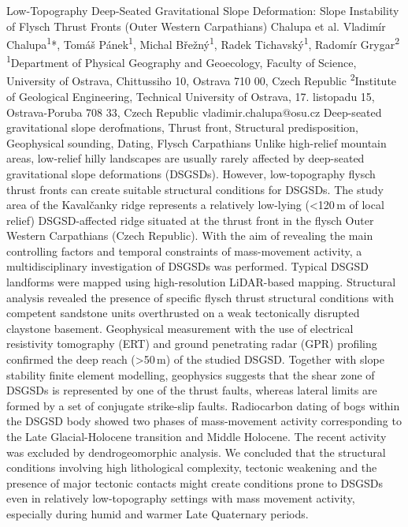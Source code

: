 
\abstract
{Low-Topography Deep-Seated Gravitational Slope Deformation: Slope Instability of Flysch Thrust Fronts (Outer Western Carpathians)} 
{Chalupa et al.} 
{Vladimír Chalupa\textsuperscript{1}*, Tomáš Pánek\textsuperscript{1}, Michal Břežný\textsuperscript{1}, Radek Tichavský\textsuperscript{1}, Radomír Grygar\textsuperscript{2}} 
{\TLtag} 
{
\textsuperscript{1}Department of Physical Geography and Geoecology, Faculty of Science, University of Ostrava, Chittussiho 10, Ostrava 710 00, Czech Republic
\textsuperscript{2}Institute of Geological Engineering, Technical University of Ostrava, 17. listopadu 15, Ostrava-Poruba 708 33, Czech Republic
}
{vladimir.chalupa@osu.cz}  %
{Deep-seated gravitational slope derofmations, Thrust front, Structural predisposition, Geophysical sounding, Dating, Flysch Carpathians}
{Unlike high-relief mountain areas, low-relief hilly landscapes are usually rarely affected by deep-seated gravitational slope deformations (DSGSDs). However, low-topography flysch thrust fronts can create suitable structural conditions for DSGSDs. The study area of the Kavalčanky ridge represents a relatively low-lying (<120 m of local relief) DSGSD-affected ridge situated at the thrust front in the flysch Outer Western Carpathians (Czech Republic). With the aim of revealing the main controlling factors and temporal constraints of mass-movement activity, a multidisciplinary investigation of DSGSDs was performed. Typical DSGSD landforms were mapped using high-resolution LiDAR-based mapping. Structural analysis revealed the presence of specific flysch thrust structural conditions with competent sandstone units overthrusted on a weak tectonically disrupted claystone basement. Geophysical measurement with the use of electrical resistivity tomography (ERT) and ground penetrating radar (GPR) profiling confirmed the deep reach (>50 m) of the studied DSGSD. Together with slope stability finite element modelling, geophysics suggests that the shear zone of DSGSDs is represented by one of the thrust faults, whereas lateral limits are formed by a set of conjugate strike-slip faults. Radiocarbon dating of bogs within the DSGSD body showed two phases of mass-movement activity corresponding to the Late Glacial-Holocene transition and Middle Holocene. The recent activity was excluded by dendrogeomorphic analysis. We concluded that the structural conditions involving high lithological complexity, tectonic weakening and the presence of major tectonic contacts might create conditions prone to DSGSDs even in relatively low-topography settings with mass movement activity, especially during humid and warmer Late Quaternary periods.
}
